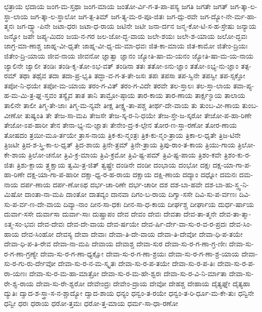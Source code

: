 {ಛತ್ರಾಯ
ಛದಾಯ
ಜಂಗ-ಮ-ಸ್ತಥಾ
ಜಂಗ-ಮಾಯ
ಜಂತೋ-ರ್ವಿ-ಗ-ತ-ಪಾ-ಪಸ್ಯ
ಜಗತಿ
ಜಗತೇ
ಜಗತ್
ಜಗ-ತ್ಕಾ-ಲ-ಸ್ಥಾ-ಲಾಯ
ಜಗ-ತ್ಕಾ-ಲ-ಸ್ಥಾಲೋ
ಜಗ-ತ್ಪ-ತಿಮ್
ಜಗ-ತ್ಯ-ಮ-ರ-ಪೂ-ಜಿತಃ
ಜಗ-ದ್ಗು-ರವೇ
ಜಗ-ದ್ಯೋ-ನೇ-ರ್ಮ-ಹಾ-ತ್ಮನಃ
ಜಗ-ದ್ವ್ಯಾ-ಪಿನೇ
ಜಟಾ-ಧರಃ
ಜಟಾ-ಧ-ರಾಯ
ಜಟಿನೇ
ಜಟೀ
ಜನಾ-ರ್ದನ
ಜನ್ಮ-ಕೋ-ಟಿ-ಸ-ಹ-ಸ್ರೇಷು
ಜನ್ಯಾಯ
ಜನ್ಯೋ
ಜಪೇ
ಜಪ್ಯ-ಮಿದಂ
ಜಯ-ನ-ಗರ
ಜಲ-ಜೋ-ದ್ಭ-ವಾಯ
ಜಲೇ-ಶಯಃ
ಜಲೇ-ಶ-ಯಾಯ
ಜಲೋ-ದ್ಭವಃ
ಜಾಗ್ರ-ಮಾ-ಣಾಶ್ಚ
ಜಾಹ್ನ-ವೀ-ಧೃತೇ
ಜಾಹ್ನ-ವೀ-ಧೃ-ದು-ಮಾ-ಧವಃ
ಜಿತ-ಕಾ-ಮಾಯ
ಜಿತ-ಕಾಮೋ
ಜಿತೇಂ-ದ್ರಿಯಃ
ಜಿತೇಂ-ದ್ರಿ-ಯಾಯ
ಜೀವ-ನಾಯ
ಜೀವನೋ
ಜ್ಞಾತ್ವಾ
ಜ್ಞಾನಂ
ಜ್ಯೋತಿ-ಷಾ-ಮ-ಯನಂ
ಜ್ಯೋತಿ-ಷಾ-ಮ-ಯ-ನಾಯ
ಜ್ವಾಲಿನೇ
ಜ್ವಾಲೀ
ತಂಡಿಃ
ತಂಡಿ-ಕೃ-ತೋ-ಽಭ-ವತ್
ತಂಡಿನಾ
ತತಃ
ತತೋ-ಽನು-ಜ್ಞಾಂ
ತತೋ-ಽಭ್ಯ-ನು-ಜ್ಞಾಂ
ತತ್ಪ-ರಮ್
ತಥಾ
ತಥೈವ
ತದಾ
ತದಾ-ಪ್ರ-ಭೃತಿ
ತದ್ಭಾ-ವ-ಗ-ತ-ತೇ-ಜಸಃ
ತಪಃ
ತಪಸಾ
ತಪ-ಸ್ವಿನೇ
ತಪಸ್ವೀ
ತಪ-ಸ್ಸಕ್ತೋ
ತಪೋ-ನಿ-ಧಯೇ
ತಪೋ-ಮ-ಯಾಯ
ತರಂ-ಗ-ವಿತ್
ತರಂ-ಗ-ವಿದೇ
ತರವೇ
ತಲ-ಸ್ತಾಲಃ
ತಲ-ಸ್ತಾ-ಲಾಯ
ತವಾ-ಪ್ಯ-ಹ-ಮ-ಮಿ-ತ್ರ-ಘ್ನ-ಸ್ತವಂ
ತಸ್ಯೈವ
ತಾತ
ತಾನಿ
ತಾಮ್ರೋ-ಷ್ಠಾಯ
ತಾರ-ಕಾಯ
ತಾರ-ಣಾಯ
ತಾರ್ಕ್ಷ-್ಯಾಯ
ತಾಲಾಯ
ತಾಲಿನೇ
ತಾಲೀ
ತಿಗ್ಮ-ತೇ-ಜಾಃ
ತಿಗ್ಮ-ಮ-ನ್ಯವೇ
ತೀಕ್ಷ
ತೀಕ್ಷ್ಣ-ತಾ-ಪಶ್ಚ
ತೀರ್ಥ-ದೇ-ವಾಯ
ತು
ತುಂಬ-ವೀ-ಣಾಯ
ತುಂಬ-ವೀಣೋ
ತುಷ್ಯಂತಿ
ತೇ
ತೇಜ-ಸಾ-ಮಪಿ
ತೇಜಸೇ
ತೇಜ-ಸ್ಕ-ರ-ನಿ-ಧಯೇ
ತೇಜ-ಸ್ತೇ-ಜ-ಸ್ಕರೋ
ತೇಜೋ-ಪ-ಹಾ-ರಿಣೇ
ತೇಜೋ-ಽಪ-ಹಾರೀ
ತೇನ
ತೇನಾ-ಭ್ಯ-ನು-ಜ್ಞಾತಃ
ತೇನೇಂ-ದ್ರ-ಕ-ಲ್ಪೇನ
ತೋರ-ಣ-ಸ್ತಾ-ರಣೋ
ತೋರ-ಣಾಯ
ತೋಷದಂ
ತ್ರಯೀ-ಮೂ-ರ್ತಯೇ
ತ್ರಾಸ-ನಾಯ
ತ್ರಿಕ-ಕು-ನ್ಮಂತ್ರಃ
ತ್ರಿಕ-ಕು-ನ್ಮಂ-ತ್ರಾಯ
ತ್ರಿಕಾ-ಲ-ಧೃತೇ
ತ್ರಿಜ-ಟಿನೇ
ತ್ರಿಜಟೀ
ತ್ರಿದ-ಶ-ಸ್ತ್ರಿ-ಕಾ-ಲ-ಧೃತ್
ತ್ರಿದ-ಶಾಯ
ತ್ರಿನೇ-ತ್ರಮ್
ತ್ರಿನೇ-ತ್ರಾಯ
ತ್ರಿಪು-ರಾಂ-ತ-ಕಾಯ
ತ್ರಿಯು-ಗಾಯ
ತ್ರಿಲೋ-ಕೇ-ಶಾಯ
ತ್ರಿಲೋ-ಚನೋ
ತ್ರಿವಿ-ಕ್ರ-ಮಾಯ
ತ್ರಿವಿ-ಕ್ರಮೋ
ತ್ರಿವಿ-ಷ್ಟ-ಪಮ್
ತ್ರಿವಿ-ಷ್ಟ-ಪಾಯ
ತ್ರಿಶಂ-ಕವೇ
ತ್ರಿಶಂ-ಕು-ರ-ಜಿತಃ
ತ್ರಿಶು-ಕ್ಲಾಯ
ತ್ರ್ಯಕ್ಷಾಯ
ತ್ವಮಿ-ತ್ರ-ಜಿತ್
ತ್ವಷ್ಟ್ರೇ
ದಂಡಿನೇ
ದಂಡೀ
ದಂಭಾಯ
ದಂಭೋ
ದಕ್ಷಃ
ದಕ್ಷ-ಯಾ-ಗಾ-ಪ-ಹಾ-ರಿಣೇ
ದಕ್ಷ-ಯಾ-ಗಾ-ಪ-ಹಾರೀ
ದಕ್ಷಾ-ಧ್ವ-ರ-ಹ-ರಾಯ
ದಕ್ಷಾಯ
ದಕ್ಷಿ-ಣಾಯ
ದದ್ಯಾಂ
ದಧ್ನೋ
ದಮನಃ
ದಮ-ನಾಯ
ದರ್ಪ-ಣಾಯ
ದರ್ಪ-ಣೋಽಥ
ದರ್ಭ-ಚಾ-ರಿಣೇ
ದರ್ಭ-ಚಾರೀ
ದಶ
ದಶ-ಬಾ-ಹವೇ
ದಶ-ಬಾ-ಹು-ಸ್ತ್ವ-ನಿ-ಮಿಷೋ
ದಾಂತಾ-ನಾ-ಮಪಿ
ದಾಂತೋ
ದಾತವ್ಯಂ
ದಾನವಾ
ದಿಗಂ-ಬ-ರಾಯ
ದಿಗ್ವಾ-ಸಸೇ
ದಿವಿ-ಸು-ಪ-ರ್ವಣಃ
ದಿವಿ-ಸು-ಪ-ರ್ವ-ಣ-ದೇ-ವಾಯ
ದಿವ್ಯಾ-ನಾಂ
ದೀನ-ಸಾ-ಧಕಃ
ದೀನ-ಸಾ-ಧ-ಕಾಯ
ದೀರ್ಘಶ್ಚ
ದೀರ್ಘಾಯ
ದುರ್ಧ-ರ್ಷಾಯ
ದುರ್ವಾ-ಸಸೇ
ದುರ್ವಾಸಾ
ದುರ್ವಾ-ಸಾಃ
ದುಷ್ಪ್ರಾಪಂ
ದೇವ
ದೇವಂ
ದೇವಃ
ದೇವತಾ
ದೇವ-ತಾ-ತ್ಮನೇ
ದೇವ-ತಾ-ತ್ಮಾ-ಽತ್ಮ-ಸಂ-ಭವಃ
ದೇವ-ದೇವಃ
ದೇವ-ದೇ-ವಾಯ
ದೇವ-ರ್ಷಯೇ
ದೇವ-ರ್ಷಿ-ರ್ದೇ-ವಾ-ಸು-ರ-ವ-ರ-ಪ್ರದಃ
ದೇವ-ಸಿಂ-ಹಾಯ
ದೇವ-ಸಿಂಹೋ
ದೇವಸ್ಯ
ದೇವಾ
ದೇವಾಃ
ದೇವಾ-ತಿ-ದೇ-ವಾಯ
ದೇವಾ-ತಿ-ದೇವೋ
ದೇವಾ-ಧಿ-ಪ-ತಯೇ
ದೇವಾ-ಧಿ-ಪ-ತಿ-ರೇವ
ದೇವಾ-ನಾ-ಮಪಿ
ದೇವಾಯ
ದೇವಾಶ್ಚ
ದೇವಾ-ಸುರ
ದೇವಾ-ಸು-ರ-ಗ-ಣಾ-ಗ್ರ-ಣೀಃ
ದೇವಾ-ಸು-ರ-ಗ-ಣಾ-ಗ್ರಣ್ಯೇ
ದೇವಾ-ಸು-ರ-ಗ-ಣಾ-ಧ್ಯಕ್ಷೋ
ದೇವಾ-ಸು-ರ-ಗ-ಣಾ-ಶ್ರಯಃ
ದೇವಾ-ಸು-ರ-ಗ-ಣಾ-ಶ್ರ-ಯಾಯ
ದೇವಾ-ಸು-ರ-ಗು-ರು-ರ್ದೇವೋ
ದೇವಾ-ಸು-ರ-ನ-ಮ-ಸ್ಕೃತಃ
ದೇವಾ-ಸು-ರ-ಪ-ತಯೇ
ದೇವಾ-ಸು-ರ-ಪ-ತಿಃ
ದೇವಾ-ಸು-ರ-ಪ-ರಾ-ಯಣಃ
ದೇವಾ-ಸು-ರ-ಮ-ಹಾ-ಮಾತ್ರೋ
ದೇವಾ-ಸು-ರ-ಮ-ಹೇ-ಶ್ವರಃ
ದೇವಾ-ಸು-ರ-ವಿ-ನಿ-ರ್ಮಾತಾ
ದೇವಾ-ಸು-ರೇ-ಶ್ವ-ರಾಯ
ದೇವಾ-ಸು-ರೇ-ಶ್ವರೋ
ದೇವೇಂದ್ರಃ
ದೇವೇಂ-ದ್ರಾಯ
ದೇವೋ
ದೇಹಶ್ಚ
ದೇಹಾಯ
ದೈತ್ಯಘ್ನೇ
ದೈತ್ಯಹಾ
ದ್ಯುತಿಃ
ದ್ವಾದ-ಶ-ಸ್ತ್ರಾ-ಸ-ನ-ಶ್ಚಾದ್ಯೋ
ದ್ವಾದ-ಶಾಯ
ಧನ್ಯಂ
ಧನ್ವಂ-ತ-ರಯೇ
ಧನ್ವಂ-ತ-ರಿ-ರ್ಧೂ-ಮ-ಕೇ-ತುಃ
ಧನ್ವಿನೇ
ಧನ್ವೀ
ಧರಃ
ಧರಾಯ
ಧರೋ-ತ್ತಮಃ
ಧರೋ-ತ್ತ-ಮಾಯ
ಧರ್ಮ-ಸಾ-ಧಾ-ರಣೋ
}
